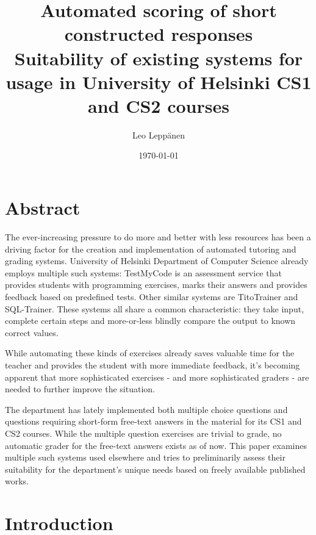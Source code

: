 \documentclass[english]{tktltiki2}
\title{
	Automated scoring of short constructed responses \\
	\small{Suitability of existing systems for usage in University of Helsinki CS1 and CS2 courses}
}
\author{Leo Leppänen}
\date{\today}
\theoremstyle{definition}
\theoremstyle{remark}
\begin{document}

\frontmatter      %

\maketitle        %

\tableofcontents  %


\mainmatter       %

\section{Abstract}

The ever-increasing pressure to do more and better with less resources has been a driving factor for the creation and implementation of automated tutoring and grading systems. University of Helsinki Department of Computer Science already employs multiple such systems: TestMyCode is an assessment service that provides students with programming exercises, marks their answers and provides feedback based on predefined tests. Other similar systems are TitoTrainer and SQL-Trainer. These systems all share a  common characteristic: they take input, complete certain steps and more-or-less blindly compare the output to known correct values. 

While automating these kinds of exercises already saves valuable time for the teacher and provides the student with more immediate feedback, it's becoming apparent that more sophisticated exercises - and more sophisticated graders - are needed to further improve the situation.

The department has lately implemented both multiple choice questions and questions requiring short-form free-text answers in the material for its CS1 and CS2 courses. While the multiple question exercises are trivial to grade, no automatic grader for the free-text answers exists as of now. This paper examines multiple such systems used elsewhere and tries to preliminarily assess their suitability for the department's unique needs based on freely available published works.

\section{Introduction}
\end{document}
